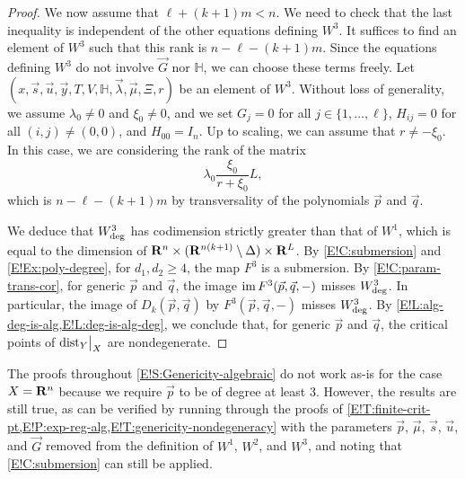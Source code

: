 \begin{proof}
  We now assume that $\ell + (k + 1) m < n$. We need to check that the last inequality is independent of the other equations defining $W^3$. It suffices to find an element of $W^3$ such that this rank is $n - \ell - (k + 1) m$. Since the equations defining $W^3$ do not involve $\vec{G}$ nor $\mathbb{H}$, we can choose these terms freely. Let $(x, \vec{s}, \vec{u}, \vec{y}, T, V, \mathbb{H}, \vec{\lambda}, \vec{\mu}, \Xi, r)$ be an element of $W^3$. Without loss of generality, we assume $\lambda_0 \neq 0$ and $\xi_0 \neq 0$, and we set $G_j = 0$ for all $j \in \{1, \ldots, \ell\}$, $H_{ij} = 0$ for all $(i, j) \neq (0, 0)$, and $H_{00} = I_n$. Up to scaling, we can assume that $r \neq -\xi_0$. In this case, we are considering the rank of the matrix
  \[
    \lambda_0 \frac{\xi_0}{r + \xi_0} L,
  \]
  which is $n - \ell - (k + 1) m$ by transversality of the polynomials $\vec{p}$ and $\vec{q}$.
  
  We deduce that $W^3_{\textnormal{deg}}$ has codimension strictly greater than that of $W^1$, which is equal to the dimension of $\mathbf{R}^n \times (\mathbf{R}^{n(k + 1)} \setminus \Delta) \times \mathbf{R}^L$. By \cref{E!C:submersion} and \cref{E!Ex:poly-degree}, for $d_1, d_2 \geq 4$, the map $F^3$ is a submersion.
  By \cref{E!C:param-trans-cor}, for generic $\vec{p}$ and $\vec{q}$, the image $\operatorname{im} F^3(\vec{p}, \vec{q}, -)$ misses $W^3_{\textnormal{deg}}$. In particular, the image of $D_k(\vec{p}, \vec{q})$ by $F^3(\vec{p}, \vec{q}, -)$ misses $W^3_{\textnormal{deg}}$. By \cref{E!L:alg-deg-is-alg,E!L:deg-is-alg-deg}, we conclude that, for generic $\vec{p}$ and $\vec{q}$, the critical points of $\mathord{\operatorname{dist}}_Y\big|_X$ are nondegenerate.
\end{proof}

\begin{remark}
\label{E!R:X-is-Rn-case}
  The proofs throughout \cref{E!S:Genericity-algebraic} do not work as-is for the case $X = \mathbf{R}^n$ because we require $\vec{p}$ to be of degree at least $3$. However, the results are still true, as can be verified by running through the proofs of \cref{E!T:finite-crit-pt,E!P:exp-reg-alg,E!T:genericity-nondegeneracy} with the parameters $\vec{p}$, $\vec{\mu}$, $\vec{s}$, $\vec{u}$, and $\vec{G}$ removed from the definition of $W^1$, $W^2$, and $W^3$, and noting that \cref{E!C:submersion} can still be applied.
\end{remark}

\printbibliography

\appendix

\let\theoldsection\thesection
\renewcommand*{\thesection}{\thepaper.\Alph{section}}
